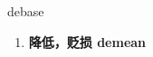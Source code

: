 
\begin{frame}
{\huge debase}
\begin{center}
\begin{enumerate}\Large
  \item \textbf{降低，贬损 demean}
\end{enumerate}
\end{center}
\end{frame}
